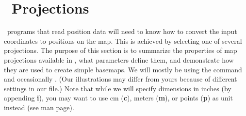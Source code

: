 %
%
\chapter{\gmt\ Projections}
\thispagestyle{headings}

\GMT\ programs that read position data will need to know how
to convert the input coordinates to positions on the map.
This is achieved by selecting one of several projections.
The purpose of this section is to summarize the properties
of map projections available in \GMT, what parameters define
them, and demonstrate how they are used to create simple
basemaps.  We will mostly be using the 
command and occasionally .  (Our illustrations
may differ from yours because of different settings in our
 file.)  Note that while we will
specify dimensions in inches (by appending {\bf i}), you may
want to use cm ({\bf c}), meters ({\bf m}), or points ({\bf p})
as unit instead (see  man page). 






